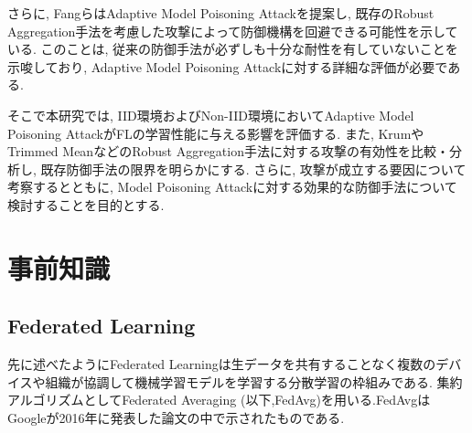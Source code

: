 \documentclass[a4j, twocolumn, dvipdfmx]{jsarticle}  %
\begin{document}
さらに, FangらはAdaptive Model Poisoning Attackを提案し, 既存のRobust Aggregation手法を考慮した攻撃によって防御機構を回避できる可能性を示している\cite{fang2020local}. このことは, 従来の防御手法が必ずしも十分な耐性を有していないことを示唆しており, Adaptive Model Poisoning Attackに対する詳細な評価が必要である.

そこで本研究では, IID環境およびNon-IID環境においてAdaptive Model Poisoning AttackがFLの学習性能に与える影響を評価する. また, KrumやTrimmed MeanなどのRobust Aggregation手法に対する攻撃の有効性を比較・分析し, 既存防御手法の限界を明らかにする. さらに, 攻撃が成立する要因について考察するとともに, Model Poisoning Attackに対する効果的な防御手法について検討することを目的とする.

\section{事前知識}
\subsection{Federated Learning}
先に述べたようにFederated Learningは生データを共有することなく複数のデバイスや組織が協調して機械学習モデルを学習する分散学習の枠組みである\cite{mammen2021fl}.
集約アルゴリズムとしてFederated Averaging (以下,FedAvg)を用いる.FedAvgはGoogleが2016年に発表した論文の中で示されたものである\cite{mcmahan2017fedavg}.
\end{document}
